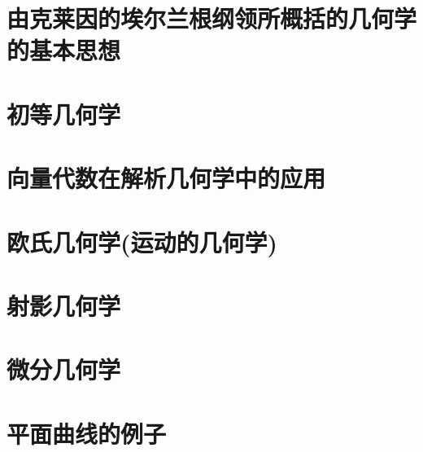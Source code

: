 \chapter{由克莱因的埃尔兰根纲领所概括的几何学的基本思想}

\chapter{初等几何学}








\chapter{向量代数在解析几何学中的应用}



\chapter{欧氏几何学(运动的几何学)}



\chapter{射影几何学}





\chapter{微分几何学}




\chapter{平面曲线的例子}









